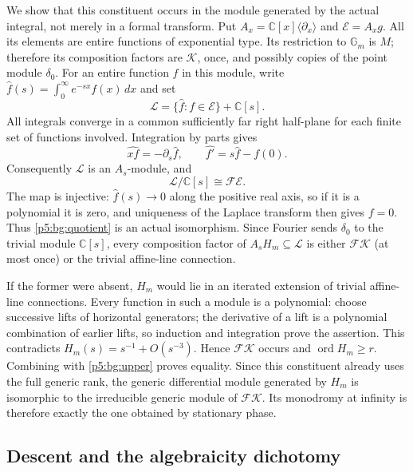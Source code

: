 \documentclass[11pt,a4paper]{article}
\theoremstyle{definition}
\theoremstyle{remark}
\numberwithin{equation}{section}
\begin{document}
We show that this constituent occurs in the module generated by the
actual integral, not merely in a formal transform.  Put
$A_x=\mathbb C[x]\langle\partial_x\rangle$ and
$\mathcal E=A_xg$.  All its elements are entire functions of
exponential type.  Its restriction to $\mathbb G_m$ is $M$;
therefore its composition factors are $\mathcal K$, once, and
possibly copies of the point module $\delta_0$.
For an entire function $f$ in this module, write
$\widehat f(s)=\int_0^\infty e^{-sx}f(x)\,dx$ and set
\[
 \mathcal L=\{\widehat f:f\in\mathcal E\}+\mathbb C[s].
\]
All integrals converge in a common sufficiently far right half-plane
for each finite set of functions involved.  Integration by parts gives
\[
 \widehat{xf}=-\partial_s\widehat f,
 \qquad \widehat{f'}=s\widehat f-f(0).
\]
Consequently $\mathcal L$ is an $A_s$-module, and
\begin{equation}\label{p5:bg:quotient}
 \mathcal L/\mathbb C[s]\cong\mathcal F\mathcal E.
\end{equation}
The map is injective: $\widehat f(s)\to0$ along the positive real
axis, so if it is a polynomial it is zero, and uniqueness of the
Laplace transform then gives $f=0$.  Thus \eqref{p5:bg:quotient} is
an actual isomorphism.  Since Fourier sends $\delta_0$ to the
trivial module $\mathbb C[s]$, every composition factor of
$A_sH_m\subseteq\mathcal L$ is either $\mathcal F\mathcal K$
(at most once) or the trivial affine-line connection.

If the former were absent, $H_m$ would lie in an iterated extension
of trivial affine-line connections.  Every function in such a module
is a polynomial: choose successive lifts of horizontal generators;
the derivative of a lift is a polynomial combination of earlier
lifts, so induction and integration prove the assertion.  This
contradicts $H_m(s)=s^{-1}+O(s^{-3})$.  Hence
$\mathcal F\mathcal K$ occurs and
$\operatorname{ord}H_m\ge r$.  Combining with \eqref{p5:bg:upper}
proves equality.  Since this constituent already uses the full
generic rank, the generic differential module generated by $H_m$
is isomorphic to the irreducible generic module of
$\mathcal F\mathcal K$.  Its monodromy at infinity is therefore
exactly the one obtained by stationary phase.

\subsection{Descent and the algebraicity dichotomy}
\end{document}
